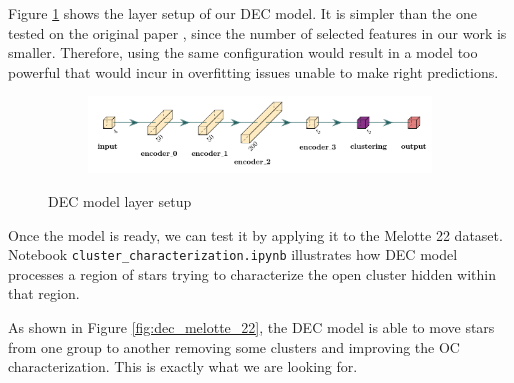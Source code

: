 \documentclass[11pt, a4paper, english]{book}
\begin{document}
Figure \ref{fig:dec_model_setup} shows the layer setup of our DEC model. It is simpler than the one tested on the original paper \cite{xie2016unsupervised},
since the number of selected features in our work is smaller. Therefore, using the same configuration would result in a model too
powerful that would incur in overfitting issues unable to make right predictions.

\begin{figure}[htbp]
  \centering
  \begin{subfigure}{0.9\textwidth}
    \centering
    \includegraphics[width=\textwidth]{../figures/dec_diagram.pdf}
  \end{subfigure}
  \caption{DEC model layer setup}
  \label{fig:dec_model_setup}
\end{figure}

Once the model is ready, we can test it by applying it to the Melotte 22 dataset.
Notebook \verb|cluster_characterization.ipynb| illustrates how DEC model processes a region of stars trying to characterize the open cluster hidden within that region.

As shown in Figure \ref{fig:dec_melotte_22}, the DEC model is able to move stars from one group to another removing some clusters and improving the OC characterization.
This is exactly what we are looking for.
\end{document}
